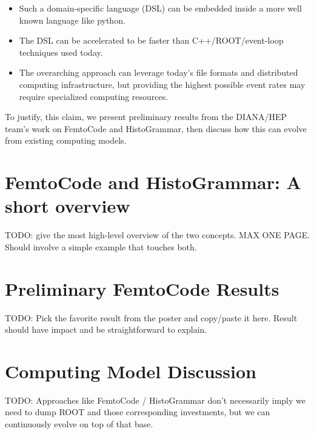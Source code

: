 \documentclass{article}
\begin{document}
\begin{itemize}
\item Such a domain-specific language (DSL) can be embedded inside a more well known language like python.
\item The DSL can be accelerated to be faster than C++/ROOT/event-loop techniques used today.
\item The overarching approach can leverage today's file formats and distributed computing infrastructure, but providing the highest possible event rates may require specialized computing resources.
\end{itemize}

To justify, this claim, we present preliminary results from the DIANA/HEP team's work on FemtoCode and HistoGrammar, then discuss how this can evolve from existing computing models.

\section{FemtoCode and HistoGrammar: A short overview}

TODO: give the most high-level overview of the two concepts.  MAX ONE PAGE.  Should involve a simple example that touches both.

\section{Preliminary FemtoCode Results}

TODO: Pick the favorite result from the poster and copy/paste it here.  Result should have impact and be straightforward to explain.

\section{Computing Model Discussion}

TODO: Approaches like FemtoCode / HistoGrammar don't necessarily imply we need to dump ROOT and those corresponding investments, but we can continuously evolve on top of that base.
\end{document}
